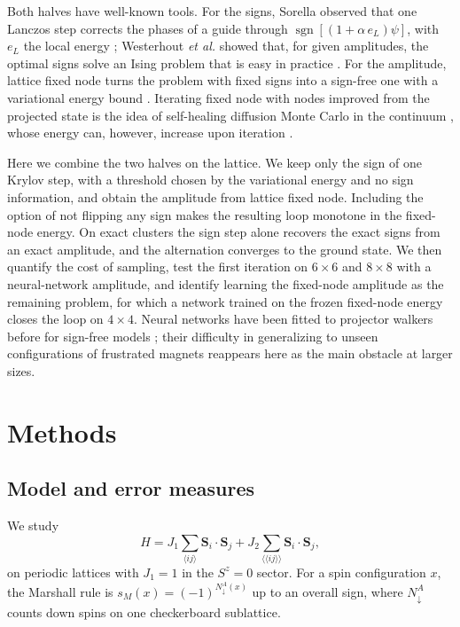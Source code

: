\documentclass[aps,prb,reprint,onecolumn,superscriptaddress,floatfix]{revtex4-2}
\begin{document}
Both halves have well-known tools. For the signs, Sorella observed that one
Lanczos step corrects the phases of a guide through
$\operatorname{sgn}[(1+\alpha\,e_L)\psi]$, with $e_L$ the local energy
\cite{Sorella2001,Sorella2002notes}; Westerhout \textit{et al.} showed that, for
given amplitudes, the optimal signs solve an Ising problem that is easy in
practice \cite{Westerhout2023}. For the amplitude, lattice fixed node turns
the problem with fixed signs into a sign-free one with a variational energy
bound \cite{vanBemmel1994,tenHaaf1995}. Iterating fixed node with nodes
improved from the projected state is the idea of self-healing diffusion
Monte Carlo in the continuum \cite{Reboredo2009}, whose energy can, however,
increase upon iteration \cite{Caffarel2026}.

Here we combine the two halves on the lattice. We keep only the sign of one
Krylov step, with a threshold chosen by the variational energy and no sign
information, and obtain the amplitude from lattice fixed node. Including the
option of not flipping any sign makes the resulting loop monotone in the
fixed-node energy. On exact clusters the sign step alone recovers the exact
signs from an exact amplitude, and the alternation converges to the ground
state. We then quantify the cost of sampling, test the first iteration on
$6\times6$ and $8\times8$ with a neural-network amplitude, and identify
learning the fixed-node amplitude as the remaining problem, for which a
network trained on the frozen fixed-node energy closes the loop on
$4\times4$. Neural networks have been fitted to projector walkers before for
sign-free models \cite{Pilati2019}; their difficulty in generalizing to
unseen configurations of frustrated magnets \cite{Westerhout2020} reappears
here as the main obstacle at larger sizes.

\section{Methods}
\label{sec:methods}

\subsection{Model and error measures}

We study
\begin{equation}
H=J_1\sum_{\langle ij\rangle}\mathbf S_i\!\cdot\!\mathbf S_j
 +J_2\sum_{\langle\!\langle ij\rangle\!\rangle}
 \mathbf S_i\!\cdot\!\mathbf S_j ,
\label{eq:H}
\end{equation}
on periodic lattices with $J_1=1$ in the $S^z=0$ sector. For a spin
configuration $x$, the Marshall rule is $s_M(x)=(-1)^{N^A_\downarrow(x)}$ up
to an overall sign, where $N^A_\downarrow$ counts down spins on one
checkerboard sublattice.
\end{document}
